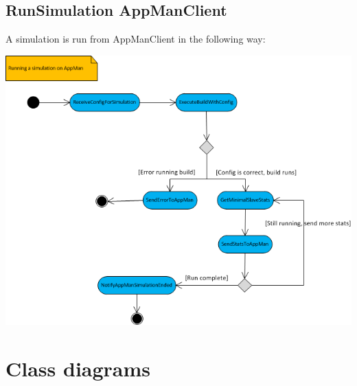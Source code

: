 \documentclass[a4paper,12pt,final]{article}
\begin{document}
\newpage
\subsection{RunSimulation AppManClient}
A simulation is run from AppManClient in the following way:
\begin{center}
\includegraphics[scale=0.9]{RunningASimOnAppManClient.png}
\end{center}








\newpage
\section{Class diagrams}
\end{document}
